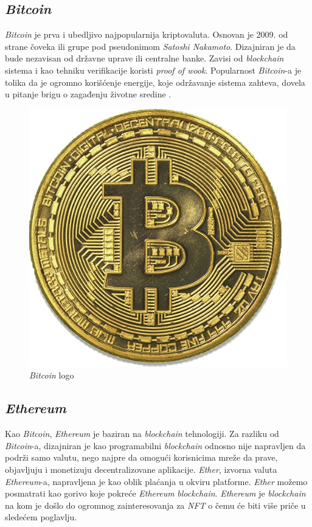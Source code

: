\documentclass[a4paper]{article}
\begin{document}
{\subsection{\emph{Bitcoin}}
\label{subsec:bitcoin}
\emph{Bitcoin} je prva i ubedljivo najpopularnija kriptovaluta. Osnovan je 2009. od strane čoveka ili grupe pod pseudonimom \emph{Satoshi Nakamoto}. Dizajniran je da bude nezavisan od državne uprave ili centralne banke. Zavisi od  \emph{blockchain} sistema i kao tehniku verifikacije koristi \emph{proof of wook}. Popularnost \emph{Bitcoin}-a je tolika da je ogromno korišćenje energije, koje održavanje sistema zahteva, dovela u pitanje brigu o zagađenju životne sredine \cite{različitekriptovalute}.

\begin{figure}[h!]
\begin{center}
\includegraphics[scale=0.3]{slike/slika3.jpg}
\end{center}
\caption{\emph{Bitcoin} logo}
\label{fig:bitcoin}
\end{figure}


\subsection{\emph{Ethereum}}
\label{subsec:ethereum}
Kao \emph{Bitcoin}, \emph{Ethereum} je baziran na  \emph{blockchain} tehnologiji. Za razliku od \emph{Bitcoin}-a, dizajniran je kao programabilni  \emph{blockchain} odnosno nije napravljen da podrži samo valutu, nego najpre da omogući korisnicima mreže da prave, objavljuju i monetizuju decentralizovane aplikacije.  \emph{Ether}, izvorna valuta \emph{Ethereum}-a, napravljena je kao oblik plaćanja u okviru platforme. \emph{Ether} možemo posmatrati kao gorivo koje pokreće \emph{Ethereum}  \emph{blockchain}. \emph{Ethereum} je  \emph{blockchain} na kom je došlo do ogromnog zainteresovanja za \emph{NFT} o čemu će biti više priče u sledećem poglavlju.

}
\end{document}
